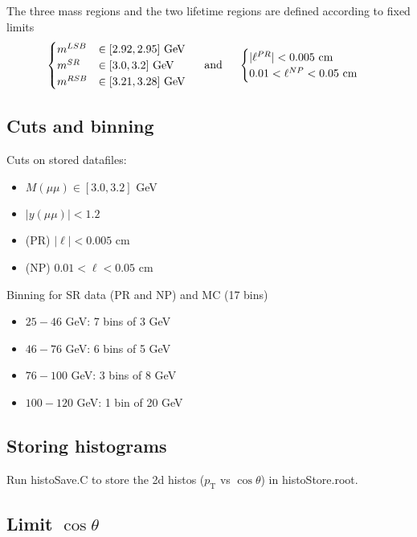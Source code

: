 \documentclass{article}
\newcommand{\pt}{p_\text{T}}
\newcommand{\cost}{\cos\theta}
\begin{document}
The three mass regions and the two lifetime regions are defined according to fixed limits
\begin{equation}\begin{cases}
m^{LSB}&\in[2.92, 2.95] \text{ GeV}\\
m^{SR}&\in[3.0, 3.2]  \text{ GeV}\\
m^{RSB}&\in[3.21, 3.28]  \text{ GeV}\\
\end{cases}\hspace{0.5cm}\text{and}\hspace{0.5cm}
\begin{cases}
|\ell^{PR}| < 0.005\text{ cm} \\
0.01 < \ell^{NP} < 0.05\text{ cm}
\end{cases}
\end{equation}

\subsection{Cuts and binning} 

Cuts on stored datafiles:
\begin{itemize}
\item $M(\mu\mu)\in[3.0,3.2]$ GeV
\item $|y(\mu\mu)|<1.2$
\item (PR) $|\ell|<0.005$ cm
\item (NP) $0.01 < \ell < 0.05$ cm
\end{itemize}

Binning for SR data (PR and NP) and MC (17 bins)
\begin{itemize}
\item $25-46$ GeV: 7 bins of 3 GeV
\item $46-76$ GeV: 6 bins of 5 GeV
\item $76-100$ GeV: 3 bins of 8 GeV
\item $100-120$ GeV: 1 bin of 20 GeV
\end{itemize}

\subsection{Storing histograms}

Run histoSave.C to store the 2d histos ($\pt$ vs $\cost$) in histoStore.root.

\subsection{Limit $\cost$}
\end{document}
